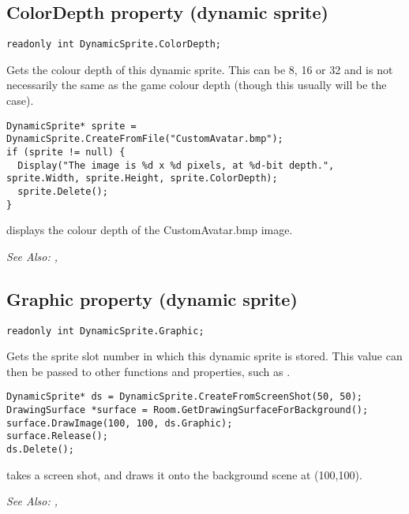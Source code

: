 \subsection{ColorDepth property (dynamic sprite)}\label{DynamicSprite.ColorDepth}%

\begin{verbatim}
readonly int DynamicSprite.ColorDepth;
\end{verbatim}
Gets the colour depth of this dynamic sprite. This can be 8, 16 or 32 and is not necessarily the same
as the game colour depth (though this usually will be the case).

\begin{verbatim}
DynamicSprite* sprite = DynamicSprite.CreateFromFile("CustomAvatar.bmp");
if (sprite != null) {
  Display("The image is %d x %d pixels, at %d-bit depth.", sprite.Width, sprite.Height, sprite.ColorDepth);
  sprite.Delete();
}
\end{verbatim}
displays the colour depth of the CustomAvatar.bmp image.

\it{See Also:} ,


\subsection{Graphic property (dynamic sprite)}\label{DynamicSprite.Graphic}%

\begin{verbatim}
readonly int DynamicSprite.Graphic;
\end{verbatim}
Gets the sprite slot number in which this dynamic sprite is stored.
This value can then be passed to other functions and properties, such as
.

\begin{verbatim}
DynamicSprite* ds = DynamicSprite.CreateFromScreenShot(50, 50);
DrawingSurface *surface = Room.GetDrawingSurfaceForBackground();
surface.DrawImage(100, 100, ds.Graphic);
surface.Release();
ds.Delete();
\end{verbatim}
takes a screen shot, and draws it onto the background scene at (100,100).

\it{See Also:} ,


